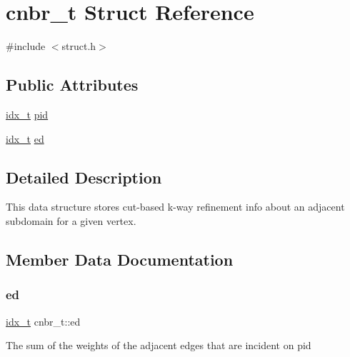 \hypertarget{structcnbr__t}{}\section{cnbr\+\_\+t Struct Reference}
\label{structcnbr__t}


{\ttfamily \#include $<$struct.\+h$>$}

\subsection*{Public Attributes}
\begin{DoxyCompactItemize}
\item 
\hyperlink{3rd_party_2parmetis-4_80_83_2metis_2include_2metis_8h_aaa5262be3e700770163401acb0150f52}{idx\+\_\+t} \hyperlink{structcnbr__t_a22be164ee3de87a051946a9ab71ae3b9}{pid}
\item 
\hyperlink{3rd_party_2parmetis-4_80_83_2metis_2include_2metis_8h_aaa5262be3e700770163401acb0150f52}{idx\+\_\+t} \hyperlink{structcnbr__t_a2dd27d862ee4554553d909072a8931f3}{ed}
\end{DoxyCompactItemize}


\subsection{Detailed Description}
This data structure stores cut-\/based k-\/way refinement info about an adjacent subdomain for a given vertex. 

\subsection{Member Data Documentation}
\mbox{\label{structcnbr__t_a2dd27d862ee4554553d909072a8931f3}} 
\subsubsection{\texorpdfstring{ed}{ed}}
{\footnotesize\ttfamily \hyperlink{3rd_party_2parmetis-4_80_83_2metis_2include_2metis_8h_aaa5262be3e700770163401acb0150f52}{idx\+\_\+t} cnbr\+\_\+t\+::ed}

The sum of the weights of the adjacent edges that are incident on pid \mbox{\label{structcnbr__t_a22be164ee3de87a051946a9ab71ae3b9}} 
